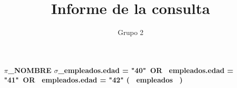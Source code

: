 \documentclass{article}
\begin{document}
\title{Informe de la consulta}
\author{Grupo 2}
\maketitle
\textbf{\Large{\newline$\pi$_{NOMBRE}
\newline$\sigma$_{empleados.edad = "40"\ OR \ empleados.edad = "41"\ OR \ empleados.edad = "42"}
(  \ empleados \  )
}
}
\end{document}
